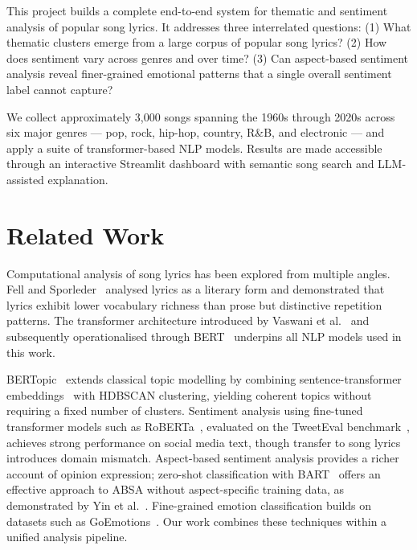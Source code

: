 \documentclass[pdflatex,sn-mathphys-num]{sn-jnl}
\begin{document}
This project builds a complete end-to-end system for thematic and sentiment analysis of popular song lyrics. It addresses three interrelated questions: (1) What thematic clusters emerge from a large corpus of popular song lyrics? (2) How does sentiment vary across genres and over time? (3) Can aspect-based sentiment analysis reveal finer-grained emotional patterns that a single overall sentiment label cannot capture?

We collect approximately 3,000 songs spanning the 1960s through 2020s across six major genres --- pop, rock, hip-hop, country, R\&B, and electronic --- and apply a suite of transformer-based NLP models. Results are made accessible through an interactive Streamlit dashboard with semantic song search and LLM-assisted explanation.

\section{Related Work}\label{sec2}

Computational analysis of song lyrics has been explored from multiple angles. Fell and Sporleder~\cite{fell2014lyrics} analysed lyrics as a literary form and demonstrated that lyrics exhibit lower vocabulary richness than prose but distinctive repetition patterns. The transformer architecture introduced by Vaswani et al.~\cite{vaswani2017attention} and subsequently operationalised through BERT~\cite{devlin2019bert} underpins all NLP models used in this work.

BERTopic~\cite{grootendorst2022bertopic} extends classical topic modelling by combining sentence-transformer embeddings~\cite{reimers2019sentence} with HDBSCAN clustering, yielding coherent topics without requiring a fixed number of clusters. Sentiment analysis using fine-tuned transformer models such as RoBERTa~\cite{liu2019roberta}, evaluated on the TweetEval benchmark~\cite{barbieri2020tweeteval}, achieves strong performance on social media text, though transfer to song lyrics introduces domain mismatch. Aspect-based sentiment analysis provides a richer account of opinion expression; zero-shot classification with BART~\cite{lewis2020bart} offers an effective approach to ABSA without aspect-specific training data, as demonstrated by Yin et al.~\cite{yin2019zeroshot}. Fine-grained emotion classification builds on datasets such as GoEmotions~\cite{demszky2020goemotions}. Our work combines these techniques within a unified analysis pipeline.
\end{document}
